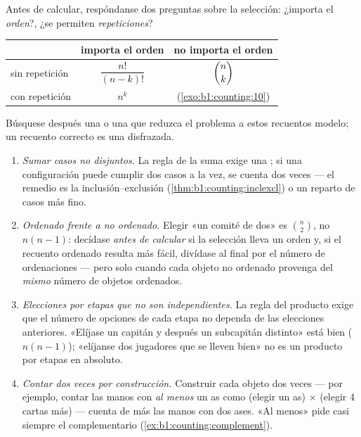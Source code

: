 \begin{method}\label{met:b1:counting:which}
Antes de calcular, respóndanse dos preguntas sobre la selección: ¿importa
el \emph{orden}?, ¿se permiten \emph{repeticiones}?
\begin{center}
\renewcommand{\arraystretch}{1.4}
\begin{tabular}{l|c|c}
 & importa el orden & no importa el orden \\
\hline
sin repetición & $\dfrac{n!}{(n-k)!}$ & $\dbinom{n}{k}$ \\[6pt]
con repetición & $n^k$ & (\cref{exo:b1:counting:10}) \\
\end{tabular}
\end{center}
Búsquese después una  o una  que reduzca el problema a
estos recuentos modelo; un recuento correcto es una  disfrazada.
\end{method}

\begin{remark}\label{rem:b1:counting:pitfalls}
\begin{enumerate}
  \item \emph{Sumar casos no disjuntos.} La regla de la suma exige una
        ; si una configuración puede cumplir dos casos a la
        vez, se cuenta dos veces --- el remedio es la
        inclusión--exclusión (\cref{thm:b1:counting:inclexcl}) o un
        reparto de casos más fino.
  \item \emph{Ordenado frente a no ordenado.} Elegir «un comité de dos»
        es $\binom n2$, no $n(n-1)$: decídase \emph{antes de calcular}
        si la selección lleva un orden y, si el recuento ordenado
        resulta más fácil, divídase al final por el número de
        ordenaciones --- pero solo cuando cada objeto no ordenado
        provenga del \emph{mismo} número de objetos ordenados.
  \item \emph{Elecciones por etapas que no son independientes.} La regla
        del producto exige que el número de opciones de cada etapa no
        dependa de las elecciones anteriores. «Elíjase un capitán y
        después un subcapitán distinto» está bien ($n(n-1)$); «elíjanse
        dos jugadores que se lleven bien» no es un producto por etapas
        en absoluto.
  \item \emph{Contar dos veces por construcción.} Construir cada objeto
        dos veces --- por ejemplo, contar las manos con \emph{al menos}
        un as como (elegir un as) $\times$ (elegir $4$ cartas más) ---
        cuenta de más las manos con dos ases. «Al menos» pide casi
        siempre el complementario
        (\cref{ex:b1:counting:complement}).
\end{enumerate}
\end{remark}

